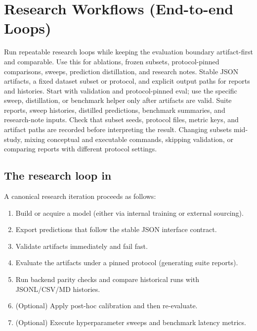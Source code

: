 \chapter{Research Workflows (End-to-end Loops)}


\WorkflowOpening
{Run repeatable research loops while keeping the evaluation boundary artifact-first and comparable.}
{Use this for ablations, frozen subsets, protocol-pinned comparisons, sweeps, prediction distillation, and research notes.}
{Stable JSON artifacts, a fixed dataset subset or protocol, and explicit output paths for reports and histories.}
{Start with validation and protocol-pinned eval; use the specific sweep, distillation, or benchmark helper only after artifacts are valid.}
{Suite reports, sweep histories, distilled predictions, benchmark summaries, and research-note inputs.}
{Check that subset seeds, protocol files, metric keys, and artifact paths are recorded before interpreting the result.}
{Changing subsets mid-study, mixing conceptual and executable commands, skipping validation, or comparing reports with different protocol settings.}

\section{The research loop in \yolozu{}}
A canonical research iteration proceeds as follows:
\begin{enumerate}
  \item Build or acquire a model (either via internal training or external sourcing).
  \item Export predictions that follow the stable JSON interface contract.
  \item Validate artifacts immediately and fail fast.
  \item Evaluate the artifacts under a pinned protocol (generating suite reports).
  \item Run backend parity checks and compare historical runs with JSONL/CSV/MD histories.
  \item (Optional) Apply post-hoc calibration and then re-evaluate.
  \item (Optional) Execute hyperparameter sweeps and benchmark latency metrics.
\end{enumerate}

